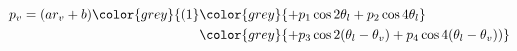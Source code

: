 \begin{align}
p_v=(ar_v+b)\color{grey}{(1}&\color{grey}{+ p_1\cos 2\theta_l + p_2\cos 4\theta_l } \\
                             & \color{grey}{+p_3\cos 2(\theta_l-\theta_v) + p_4\cos 4(\theta_l-\theta_v))}
\end{align}
